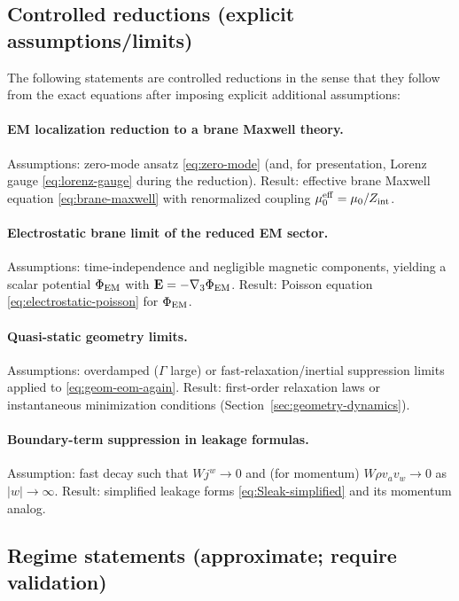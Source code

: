 \documentclass[11pt]{article}
\begin{document}
\subsection{Controlled reductions (explicit assumptions/limits)}
\label{app:claims-controlled}

The following statements are controlled reductions in the sense that they follow from the exact equations after imposing explicit additional assumptions:

\paragraph{EM localization reduction to a brane Maxwell theory.}
Assumptions: zero-mode ansatz \eqref{eq:zero-mode} (and, for presentation, Lorenz gauge \eqref{eq:lorenz-gauge} during the reduction). Result: effective brane Maxwell equation \eqref{eq:brane-maxwell} with renormalized coupling $\mu_0^{\rm eff}=\mu_0/Z_{\rm int}$.

\paragraph{Electrostatic brane limit of the reduced EM sector.}
Assumptions: time-independence and negligible magnetic components, yielding a scalar potential $\Phi_{\rm EM}$ with $\mathbf{E}=-\nabla_3\Phi_{\rm EM}$. Result: Poisson equation \eqref{eq:electrostatic-poisson} for $\Phi_{\rm EM}$.

\paragraph{Quasi-static geometry limits.}
Assumptions: overdamped ($\Gamma$ large) or fast-relaxation/inertial suppression limits applied to \eqref{eq:geom-eom-again}. Result: first-order relaxation laws or instantaneous minimization conditions (Section~\ref{sec:geometry-dynamics}).

\paragraph{Boundary-term suppression in leakage formulas.}
Assumption: fast decay such that $Wj^w\to 0$ and (for momentum) $W\rho v_a v_w\to 0$ as $|w|\to\infty$. Result: simplified leakage forms \eqref{eq:Sleak-simplified} and its momentum analog.

\subsection{Regime statements (approximate; require validation)}
\label{app:claims-regime}
\end{document}
